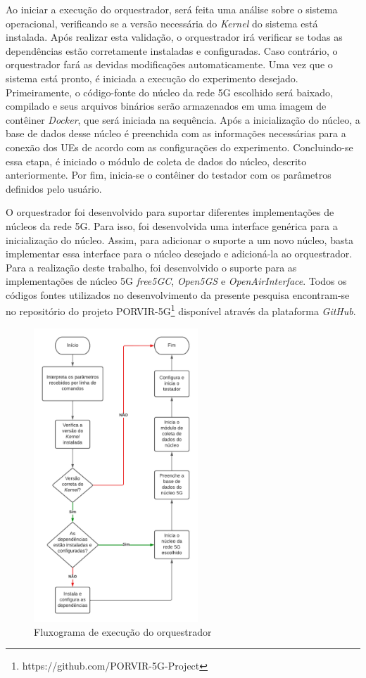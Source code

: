 Ao iniciar a execução do orquestrador, será feita uma análise sobre o sistema operacional, verificando se a versão necessária do \textit{Kernel} do sistema está instalada.
Após realizar esta validação, o orquestrador irá verificar se todas as dependências estão corretamente instaladas e configuradas. Caso contrário, o orquestrador fará as devidas modificações automaticamente.
Uma vez que o sistema está pronto, é iniciada a execução do experimento desejado.
Primeiramente, o código-fonte do núcleo da rede 5G escolhido será baixado, compilado e seus arquivos binários serão armazenados em uma imagem de contêiner \textit{Docker}, que será iniciada na sequência.
Após a inicialização do núcleo, a base de dados desse núcleo é preenchida com as informações necessárias para a conexão dos UEs de acordo com as configurações do experimento.
Concluindo-se essa etapa, é iniciado o módulo de coleta de dados do núcleo, descrito anteriormente.
Por fim, inicia-se o contêiner do testador com os parâmetros definidos pelo usuário.

O orquestrador foi desenvolvido para suportar diferentes implementações de núcleos da rede 5G. Para isso, foi desenvolvida uma interface genérica para a inicialização do núcleo. Assim, para adicionar o suporte a um novo núcleo, basta implementar essa interface para o núcleo desejado e adicioná-la ao orquestrador.
Para a realização deste trabalho, foi desenvolvido o suporte para as implementações de núcleo 5G \textit{free5GC}, \textit{Open5GS} e \textit{OpenAirInterface}.
Todos os códigos fontes utilizados no desenvolvimento da presente pesquisa encontram-se no repositório do projeto PORVIR-5G\footnote{https://github.com/PORVIR-5G-Project} disponível através da plataforma \textit{GitHub}.

\begin{figure}[!ht]
    \centering
    \includegraphics[width=0.55\textwidth]{TG2/Chapters/Soluction/Figures/Fluxograma-Orquestrador.pdf}
    \caption{Fluxograma de execução do orquestrador}
    \label{fig:flux_orq}
\end{figure}
